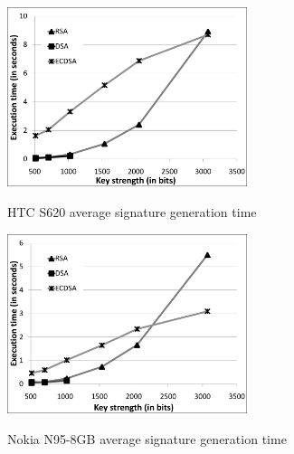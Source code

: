 \documentclass[authoryear]{elsarticle}
\begin{document}
\begin{figure}[ht]
\begin{center}
  \includegraphics[width=7cm]{immagini/HTCSign.pdf}\\
  \caption{HTC S620 average signature generation time}
  \label{fig:HTCSign}
\end{center}
\end{figure}

\begin{figure}[ht]
\begin{center}
  \includegraphics[width=7cm]{immagini/N95Sign.pdf}\\
  \caption{Nokia N95-8GB average signature generation time}
  \label{fig:N95Sign}
\end{center}
\end{figure}
\end{document}
